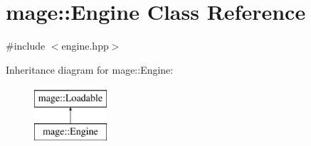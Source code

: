 \hypertarget{classmage_1_1_engine}{}\section{mage\+:\+:Engine Class Reference}
\label{classmage_1_1_engine}


{\ttfamily \#include $<$engine.\+hpp$>$}

Inheritance diagram for mage\+:\+:Engine\+:\begin{figure}[H]
\begin{center}
\leavevmode
\includegraphics[height=2.000000cm]{classmage_1_1_engine}
\end{center}
\end{figure}
